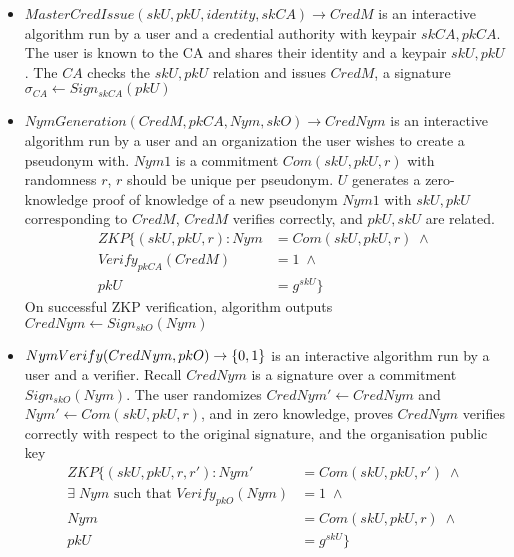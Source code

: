 \begin{itemize}
    \item \textbf{$MasterCredIssue(skU, pkU, identity, skCA) \to CredM$} is an interactive algorithm run by a user and a credential authority with keypair $skCA, pkCA$. The user is known to the CA and shares their identity and a keypair $skU, pkU$. The $CA$ checks the $skU, pkU$ relation and issues $CredM$, a signature $\sigma_{CA} \gets Sign_{skCA}(pkU)$
    
    \item \textbf{$NymGeneration(CredM, pkCA, Nym, skO) \to CredNym$} is an interactive algorithm run by a user and an organization the user wishes to create a pseudonym with. 
    $Nym1$ is a commitment $Com(skU, pkU, r)$ with randomness $r$, $r$ should be unique per pseudonym. 
    $U$ generates a zero-knowledge proof of knowledge of a new pseudonym $Nym1$ with $skU, pkU$ corresponding to $CredM$, $CredM$ verifies correctly, and $pkU, skU$ are related. 
    \[
    \begin{aligned}
    ZKP
    \{ 
        (skU, pkU, r): Nym &= Com(skU, pkU, r) \; \wedge \\
        Verify_{pkCA}(CredM) &= 1 \; \wedge \\ 
        pkU &= g^{skU}
     \}
    \end{aligned}
    \]
    On successful ZKP verification, algorithm outputs $CredNym \gets Sign_{skO}(Nym)$

    \item \textbf{$NymVerify(CredNym, pkO) \to \{0,1\} $} is an interactive algorithm run by a user and a verifier. Recall $CredNym$ is a signature over a commitment $Sign_{skO}(Nym)$. The user randomizes $CredNym' \gets CredNym$ and $Nym' \gets Com(skU, pkU, r)$, and in zero knowledge, proves $CredNym$ verifies correctly with respect to the original signature, and the organisation public key
        \[
        \begin{aligned}
        ZKP
        \{  
            (skU, pkU, r, r'): Nym' &= Com(skU, pkU, r') \; \wedge \\
            \exists \; Nym \text{ such that } Verify_{pkO}(Nym) &= 1 \; \wedge \\ 
            Nym &= Com(skU, pkU, r) \; \wedge \\
            pkU &= g^{skU}
        \}
        \end{aligned}
        \]
\end{itemize}






